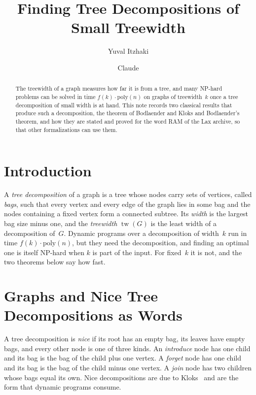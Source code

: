 \documentclass[11pt,a4paper]{article}
\title{Finding Tree Decompositions of Small Treewidth}
\author{Yuval Itzhaki \and Claude}
\date{}
\theoremstyle{definition}
\newcommand{\tw}{\operatorname{tw}}
\begin{document}
\maketitle

\begin{abstract}
The treewidth of a graph measures how far it is from a tree, and many NP-hard problems can be
solved in time $f(k)\cdot\mathrm{poly}(n)$ on graphs of treewidth~$k$ once a tree decomposition of
small width is at hand. This note records two classical results that produce such a decomposition,
the theorem of Bodlaender and Kloks and Bodlaender's theorem, and how they are stated and proved
for the word RAM of the Lax archive, so that other formalizations can use them.
\end{abstract}

\section{Introduction}

A \emph{tree decomposition} of a graph is a tree whose nodes carry sets of vertices, called
\emph{bags}, such that every vertex and every edge of the graph lies in some bag and the nodes
containing a fixed vertex form a connected subtree. Its \emph{width} is the largest bag size minus
one, and the \emph{treewidth} $\tw(G)$ is the least width of a decomposition of~$G$. Dynamic
programs over a decomposition of width~$k$ run in time $f(k)\cdot\mathrm{poly}(n)$, but they need
the decomposition, and finding an optimal one is itself NP-hard when $k$ is part of the input.
For fixed~$k$ it is not, and the two theorems below say how fast.

\section{Graphs and Nice Tree Decompositions as Words}

A tree decomposition is \emph{nice} if its root has an empty bag, its leaves have empty bags, and
every other node is one of three kinds. An \emph{introduce} node has one child and its bag is the
bag of the child plus one vertex. A \emph{forget} node has one child and its bag is the bag of the
child minus one vertex. A \emph{join} node has two children whose bags equal its own. Nice
decompositions are due to Kloks~\cite{kloks1994treewidth} and are the form that dynamic programs
consume.
\end{document}
